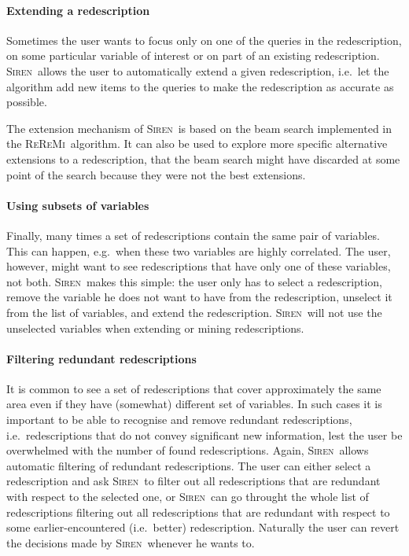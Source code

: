 \documentclass{sig-alternate}
\newcommand{\prg}[1]{\paragraph{#1}}
\newcommand{\Siren}{\textsc{Siren}}
\newcommand{\ReReMi}{\textsc{ReReMi}}
\begin{document}
\prg{Extending a redescription}
Sometimes the user wants to focus only on one of the queries in the
redescription, on some particular variable of interest or on part of an existing redescription. 
\Siren\ allows the user to automatically extend a given
redescription, i.e.\ let the algorithm add new items to the queries to
make the redescription as accurate as possible.

The extension mechanism of \Siren\ is based on the beam search implemented in
the \ReReMi\ algorithm.  It can also be used to explore more specific
alternative extensions to a redescription, that the beam search might
have discarded at some point of the search because they were not the
best extensions.





\prg{Using subsets of variables}
Finally, many times a set of redescriptions contain the same pair of
variables. This can happen, e.g.\ when these two variables are highly
correlated. The user, however, might want to see redescriptions that have
only one of these variables, not both. \Siren\ makes this simple: the user
only has to select a redescription, remove the variable he does not
want to have from the redescription, unselect it from the list of variables, and
extend the redescription. \Siren\ will not use the unselected
variables when extending or mining redescriptions.






\prg{Filtering redundant redescriptions}
\label{sec:filt-redund-redescr}
It is common to see a set of redescriptions that cover approximately
the same area even if they have (somewhat) different set of
variables. In such cases it is important to be able to recognise and
remove redundant redescriptions, i.e.\ redescriptions that do not
convey significant new information, lest the user be overwhelmed with
the number of found redescriptions. Again, \Siren\ allows automatic
filtering of redundant redescriptions. The user can either select a
redescription and ask \Siren\ to filter out all redescriptions that
are redundant with respect to the selected one, or \Siren\
can go throught the whole list of redescriptions filtering out all
redescriptions that are redundant with respect to some
earlier-encountered (i.e.\ better) redescription. Naturally the user
can revert the decisions made by \Siren\ whenever he wants to.
\end{document}
